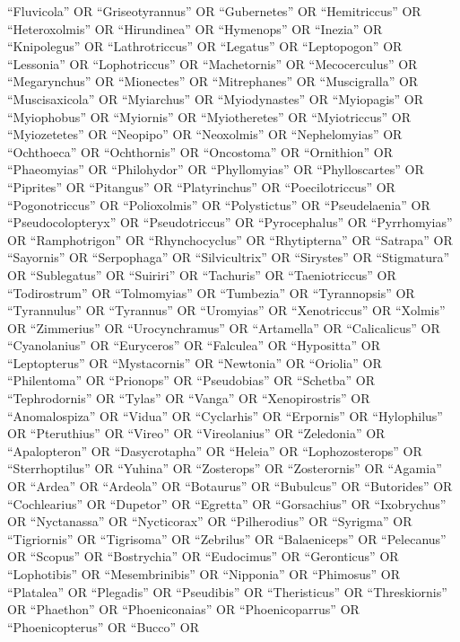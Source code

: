 \documentclass[
  number,
  review,
  onecolumn]{elsarticle}
\begin{document}
``Fluvicola'' OR ``Griseotyrannus'' OR ``Gubernetes'' OR ``Hemitriccus''
OR ``Heteroxolmis'' OR ``Hirundinea'' OR ``Hymenops'' OR ``Inezia'' OR
``Knipolegus'' OR ``Lathrotriccus'' OR ``Legatus'' OR ``Leptopogon'' OR
``Lessonia'' OR ``Lophotriccus'' OR ``Machetornis'' OR ``Mecocerculus''
OR ``Megarynchus'' OR ``Mionectes'' OR ``Mitrephanes'' OR
``Muscigralla'' OR ``Muscisaxicola'' OR ``Myiarchus'' OR
``Myiodynastes'' OR ``Myiopagis'' OR ``Myiophobus'' OR ``Myiornis'' OR
``Myiotheretes'' OR ``Myiotriccus'' OR ``Myiozetetes'' OR ``Neopipo'' OR
``Neoxolmis'' OR ``Nephelomyias'' OR ``Ochthoeca'' OR ``Ochthornis'' OR
``Oncostoma'' OR ``Ornithion'' OR ``Phaeomyias'' OR ``Philohydor'' OR
``Phyllomyias'' OR ``Phylloscartes'' OR ``Piprites'' OR ``Pitangus'' OR
``Platyrinchus'' OR ``Poecilotriccus'' OR ``Pogonotriccus'' OR
``Polioxolmis'' OR ``Polystictus'' OR ``Pseudelaenia'' OR
``Pseudocolopteryx'' OR ``Pseudotriccus'' OR ``Pyrocephalus'' OR
``Pyrrhomyias'' OR ``Ramphotrigon'' OR ``Rhynchocyclus'' OR
``Rhytipterna'' OR ``Satrapa'' OR ``Sayornis'' OR ``Serpophaga'' OR
``Silvicultrix'' OR ``Sirystes'' OR ``Stigmatura'' OR ``Sublegatus'' OR
``Suiriri'' OR ``Tachuris'' OR ``Taeniotriccus'' OR ``Todirostrum'' OR
``Tolmomyias'' OR ``Tumbezia'' OR ``Tyrannopsis'' OR ``Tyrannulus'' OR
``Tyrannus'' OR ``Uromyias'' OR ``Xenotriccus'' OR ``Xolmis'' OR
``Zimmerius'' OR ``Urocynchramus'' OR ``Artamella'' OR ``Calicalicus''
OR ``Cyanolanius'' OR ``Euryceros'' OR ``Falculea'' OR ``Hypositta'' OR
``Leptopterus'' OR ``Mystacornis'' OR ``Newtonia'' OR ``Oriolia'' OR
``Philentoma'' OR ``Prionops'' OR ``Pseudobias'' OR ``Schetba'' OR
``Tephrodornis'' OR ``Tylas'' OR ``Vanga'' OR ``Xenopirostris'' OR
``Anomalospiza'' OR ``Vidua'' OR ``Cyclarhis'' OR ``Erpornis'' OR
``Hylophilus'' OR ``Pteruthius'' OR ``Vireo'' OR ``Vireolanius'' OR
``Zeledonia'' OR ``Apalopteron'' OR ``Dasycrotapha'' OR ``Heleia'' OR
``Lophozosterops'' OR ``Sterrhoptilus'' OR ``Yuhina'' OR ``Zosterops''
OR ``Zosterornis'' OR ``Agamia'' OR ``Ardea'' OR ``Ardeola'' OR
``Botaurus'' OR ``Bubulcus'' OR ``Butorides'' OR ``Cochlearius'' OR
``Dupetor'' OR ``Egretta'' OR ``Gorsachius'' OR ``Ixobrychus'' OR
``Nyctanassa'' OR ``Nycticorax'' OR ``Pilherodius'' OR ``Syrigma'' OR
``Tigriornis'' OR ``Tigrisoma'' OR ``Zebrilus'' OR ``Balaeniceps'' OR
``Pelecanus'' OR ``Scopus'' OR ``Bostrychia'' OR ``Eudocimus'' OR
``Geronticus'' OR ``Lophotibis'' OR ``Mesembrinibis'' OR ``Nipponia'' OR
``Phimosus'' OR ``Platalea'' OR ``Plegadis'' OR ``Pseudibis'' OR
``Theristicus'' OR ``Threskiornis'' OR ``Phaethon'' OR ``Phoeniconaias''
OR ``Phoenicoparrus'' OR ``Phoenicopterus'' OR ``Bucco'' OR
\end{document}

